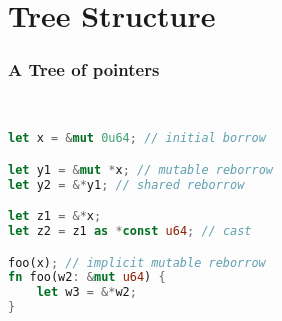 \section{Tree Structure}

\begin{frame}[fragile]
    \frametitle{A Tree of pointers}
    \begin{minipage}{0.27\textwidth}
        \begin{block}{}
        \end{block}
    \end{minipage}
    ~\ ~\
    \begin{minipage}{0.65\textwidth}
        \begin{block}{}
            \begin{lstlisting}[language=rust]
let x = &mut 0u64; // initial borrow

let y1 = &mut *x; // mutable reborrow
let y2 = &*y1; // shared reborrow

let z1 = &*x;
let z2 = z1 as *const u64; // cast

foo(x); // implicit mutable reborrow
fn foo(w2: &mut u64) {
    let w3 = &*w2;
}

            \end{lstlisting}
        \end{block}
    \end{minipage}
\end{frame}

